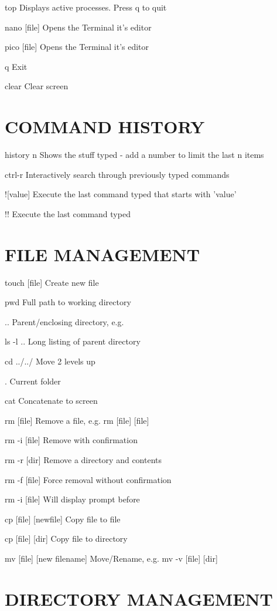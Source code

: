 \documentclass{article}
\begin{document}
 top  Displays active processes. Press q to quit 

 nano [file]  Opens the Terminal it's editor 

 pico [file]  Opens the Terminal it's editor 

 q  Exit 

 clear  Clear screen 

\section*{COMMAND HISTORY}

 history n  Shows the stuff typed - add a number to limit the last n items 

 ctrl-r  Interactively search through previously typed commands 

 ![value]  Execute the last command typed that starts with 'value' 

 !!  Execute the last command typed 

\section*{FILE MANAGEMENT}

 touch [file]  Create new file 

 pwd  Full path to working directory 

 ..  Parent/enclosing directory, e.g. 

 ls -l ..  Long listing of parent directory 

 cd ../../  Move 2 levels up 

 .  Current folder 

 cat  Concatenate to screen 

 rm [file]  Remove a file, e.g. rm [file] [file] 

 rm -i [file]  Remove with confirmation 

 rm -r [dir]  Remove a directory and contents 

 rm -f [file]  Force removal without confirmation 

 rm -i [file]  Will display prompt before 

 cp [file] [newfile]  Copy file to file 

 cp [file] [dir]  Copy file to directory 

 mv [file] [new filename]  Move/Rename, e.g. mv -v [file] [dir] 

\section*{DIRECTORY MANAGEMENT}
\end{document}
